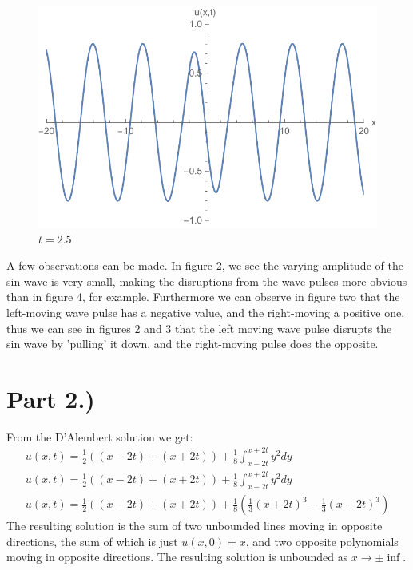 \documentclass{article}
\begin{document}
\begin{figure}[H]
\begin{minipage}[b]{0.49\textwidth}
  \end{minipage}
    \hfill
  \begin{minipage}[b]{0.49\textwidth}
    \includegraphics[width=\textwidth]{plot_t_25.pdf}
    \caption{$t = 2.5$}

  \end{minipage}
\end{figure}
A few observations can be made. In figure 2, we see the varying amplitude of the sin wave is very small, making the disruptions from the wave pulses more obvious than in figure 4, for example. Furthermore we can observe in figure two that the left-moving wave pulse has a negative value, and the right-moving a positive one, thus we can see in figures 2 and 3 that the left moving wave pulse disrupts the sin wave by 'pulling' it down, and the right-moving pulse does the opposite.
\section*{Part 2.)}
From the D'Alembert solution we get:
\begin{equation}
\begin{aligned}
u(x,t) = \frac{1}{2} ( (x - 2t) + (x + 2t)) + \frac{1}{8} \int_{x-2t}^{x+2t} y^2dy\\
u(x,t) = \frac{1}{2} ( (x - 2t) + (x + 2t)) + \frac{1}{8} \int_{x-2t}^{x+2t} y^2dy\\
u(x,t) = \frac{1}{2} ( (x - 2t) + (x + 2t)) + \frac{1}{8}(\frac{1}{3}(x+2t)^3 - \frac{1}{3}(x-2t)^3)
\end{aligned}
\end{equation}
The resulting solution is the sum of two unbounded lines moving in opposite directions, the sum of which is just $u(x, 0) = x$, and two opposite polynomials moving in opposite directions. The resulting solution is unbounded as $x \to \pm \inf$.
\end{document}
